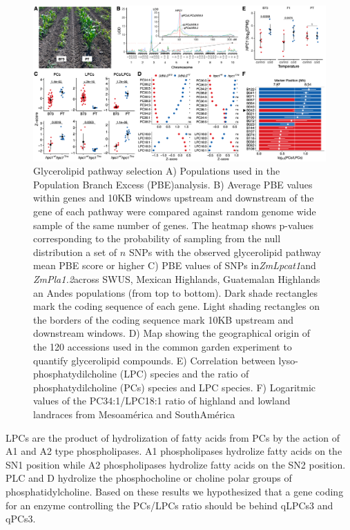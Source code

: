 \documentclass[9pt,twocolumn,twoside]{BioRxiv}
\begin{document}
\begin{figure}[h]
\begin{center}
\includegraphics[width=0.8\paperwidth]{Figures/Fig_3.png}
\caption{Glycerolipid pathway selection 
A) Populations used in the Population Branch Excess (PBE)analysis. 
B) Average PBE values within genes and 10KB windows upstream and downstream of the gene of each pathway were compared against random genome wide sample of the same number of genes. The heatmap shows p-values corresponding to the probability of sampling from the null distribution a set of $n$ SNPs with the observed glycerolipid pathway mean PBE score or higher 
C) PBE values of SNPs in\textit{ZmLpcat1}and\textit{ ZmPla1.2}across SWUS, Mexican Highlands, Guatemalan Highlands an Andes populations (from top to bottom). Dark shade rectangles mark the coding sequence of each gene. Light shading rectangles on the borders of the coding sequence mark 10KB upstream and downstream windows. 
D) Map showing the geographical origin of the 120 accessions used in the common garden experiment to quantify glycerolipid compounds.
E) Correlation between  lyso-phosphatydilcholine (LPC) species and the ratio of  phosphatydilcholine (PCs) species and LPC species. 
F) Logaritmic values of the PC34:1/LPC18:1 ratio of highland and lowland landraces from Mesoamérica and SouthAmérica}
\label{Fig3}
\end{center}
\end{figure} 
LPCs are the product of hydrolization of fatty acids from PCs by the action of A1 and A2 type phospholipases. A1 phospholipases hydrolize fatty acids on the SN1 position while A2 phospholipases hydrolize fatty acids on the SN2 position. 
PLC and D hydrolize the phosphocholine or choline polar groups of phosphatidylcholine.  
Based on these results we hypothesized that a gene coding for an enzyme controlling the PCs/LPCs ratio should be behind  qLPCs3 and qPCs3. 
\end{document}
